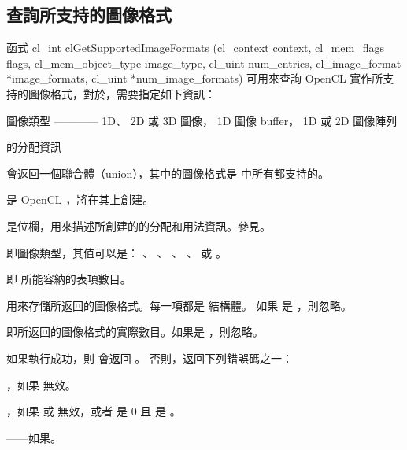 \subsection{查詢所支持的圖像格式}

函式
\startCLFUNC
cl_int clGetSupportedImageFormats (cl_context context,
			cl_mem_flags flags,
			cl_mem_object_type image_type,
			cl_uint num_entries,
			cl_image_format *image_formats,
			cl_uint *num_image_formats)
\stopCLFUNC
可用來查詢 OpenCL 實作所支持的圖像格式，對於，需要指定如下資訊：
\startigBase
\item {}
\item 圖像類型 ———— 1D、 2D 或 3D 圖像， 1D 圖像 buffer， 1D 或 2D 圖像陣列
\item {}的分配資訊
\stopigBase

 會返回一個聯合體（union），其中的圖像格式是  中所有都支持的。

 是 OpenCL ，將在其上創建。

 是位欄，用來描述所創建的的分配和用法資訊。參見。

 即圖像類型，其值可以是：
 、 、
 、 、
  或 。

 即  所能容納的表項數目。

 用來存儲所返回的圖像格式。每一項都是  結構體。
如果  是 ，則忽略。

 即所返回的圖像格式的實際數目。如果是 ，則忽略。

如果執行成功，則  會返回 。
否則，返回下列錯誤碼之一：

\startigBase
\item {}，如果  無效。

\item {}，如果  或  無效，或者  是 0 且  是 。

\item {}——如果\scdevfailres。

